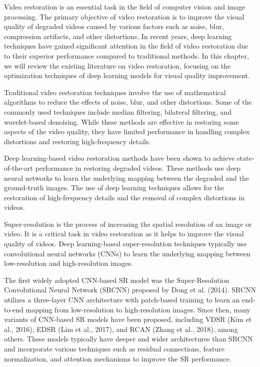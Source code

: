 \label{chap:Background}

Video restoration is an essential task in the field of computer vision and image processing. The primary objective of video restoration is to improve the visual quality of degraded videos caused by various factors such as noise, blur, compression artifacts, and other distortions. In recent years, deep learning techniques have gained significant attention in the field of video restoration due to their superior performance compared to traditional methods. In this chapter, we will review the existing literature on video restoration, focusing on the optimization techniques of deep learning models for visual quality improvement.

Traditional video restoration techniques involve the use of mathematical algorithms to reduce the effects of noise, blur, and other distortions. Some of the commonly used techniques include median filtering, bilateral filtering, and wavelet-based denoising. While these methods are effective in restoring some aspects of the video quality, they have limited performance in handling complex distortions and restoring high-frequency details.

Deep learning-based video restoration methods have been shown to achieve state-of-the-art performance in restoring degraded videos. These methods use deep neural networks to learn the underlying mapping between the degraded and the ground-truth images. The use of deep learning techniques allows for the restoration of high-frequency details and the removal of complex distortions in videos.

Super-resolution is the process of increasing the spatial resolution of an image or video. It is a critical task in video restoration as it helps to improve the visual quality of videos. Deep learning-based super-resolution techniques typically use convolutional neural networks (CNNs) to learn the underlying mapping between low-resolution and high-resolution images.

The first widely adopted CNN-based SR model was the Super-Resolution Convolutional Neural Network (SRCNN) proposed by Dong et al. (2014). SRCNN utilizes a three-layer CNN architecture with patch-based training to learn an end-to-end mapping from low-resolution to high-resolution images. Since then, many variants of CNN-based SR models have been proposed, including VDSR (Kim et al., 2016), EDSR (Lim et al., 2017), and RCAN (Zhang et al., 2018), among others. These models typically have deeper and wider architectures than SRCNN and incorporate various techniques such as residual connections, feature normalization, and attention mechanisms to improve the SR performance.
 
